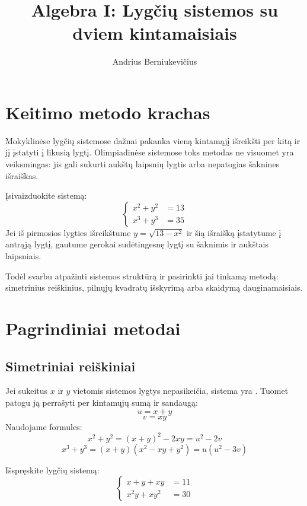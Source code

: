 \documentclass[11pt,a4paper]{scrartcl}
\title{Algebra I: Lygčių sistemos su dviem kintamaisiais}
\author{Andrius Berniukevičius}
\begin{document}
\maketitle

\section{Keitimo metodo krachas}

Mokyklinėse lygčių sistemose dažnai pakanka vieną kintamąjį išreikšti per kitą ir jį įstatyti į likusią lygtį. Olimpiadinėse sistemose toks metodas ne visuomet yra veiksmingas: jis gali sukurti aukštų laipsnių lygtis arba nepatogias šaknines išraiškas.

Įsivaizduokite sistemą:
\[
\left\{\begin{aligned}
    x^2 + y^2 &= 13 \\
    x^3 + y^3 &= 35
\end{aligned}\right.
\]
Jei iš pirmosios lygties išreikštume $y = \sqrt{13-x^2}$ ir šią išraišką įstatytume į antrąją lygtį, gautume gerokai sudėtingesnę lygtį su šaknimis ir aukštais laipsniais.

Todėl svarbu atpažinti sistemos struktūrą ir pasirinkti jai tinkamą metodą: simetrinius reiškinius, pilnųjų kvadratų išskyrimą arba skaidymą dauginamaisiais.

\section{Pagrindiniai metodai}

\subsection{Simetriniai reiškiniai}
Jei sukeitus $x$ ir $y$ vietomis sistemos lygtys nepasikeičia, sistema yra . Tuomet patogu ją perrašyti per kintamųjų sumą ir sandaugą:
$$ u = x + y $$
$$ v = x y $$
Naudojame formules:
$$ x^2 + y^2 = (x+y)^2 - 2xy = u^2 - 2v $$
$$ x^3 + y^3 = (x+y)(x^2 - xy + y^2) = u(u^2 - 3v) $$

\begin{example}
Išspręskite lygčių sistemą:
\[
\left\{\begin{aligned}
    x + y + xy &= 11 \\
    x^2 y + x y^2 &= 30
\end{aligned}\right.
\]
\end{example}
\end{document}
